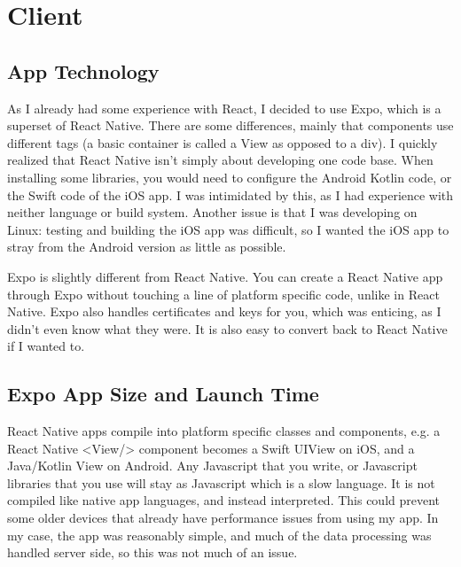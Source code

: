 \documentclass{l4proj}
\begin{document}
\section{Client}
\subsection{App Technology}
As I already had some experience with React, I decided to use Expo, which is a superset of React Native. There are some differences, mainly that components use different tags (a basic container is called a View as opposed to a div). I quickly realized that React Native isn't simply about developing one code base. When installing some libraries, you would need to configure the Android Kotlin code, or the Swift code of the iOS app. I was intimidated by this, as I had experience with neither language or build system. Another issue is that I was developing on Linux: testing and building the iOS app was difficult, so I wanted the iOS app to stray from the Android version as little as possible.

Expo is slightly different from React Native. You can create a React Native app through Expo without touching a line of platform specific code, unlike in React Native. Expo also handles certificates and keys for you, which was enticing, as I didn't even know what they were. It is also easy to convert back to React Native if I wanted to. 

\subsection{Expo App Size and Launch Time}
React Native apps compile into platform specific classes and components, e.g. a React Native <View/> component becomes a Swift UIView on iOS, and a Java/Kotlin View on Android. Any Javascript that you write, or Javascript libraries that you use will stay as Javascript which is a slow language. It is not compiled like native app languages, and instead interpreted. This could prevent some older devices that already have performance issues from using my app. In my case, the app was reasonably simple, and much of the data processing was handled server side, so this was not much of an issue. 
\end{document}
